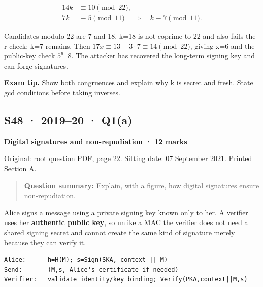 \documentclass[11pt,a4paper]{article}
\begin{document}
\[
\begin{aligned}14k&\equiv10\pmod{22},\\7k&\equiv5\pmod{11}\quad\Longrightarrow\quad k\equiv7\pmod{11}.\end{aligned}
\]

Candidates modulo 22 are 7 and 18. k=\allowbreak{}18 is not coprime to 22 and also fails the r check; k=\allowbreak{}7 remains. Then \(17x\equiv13-3\cdot7\equiv14\pmod{22}\),\allowbreak{} giving x=\allowbreak{}6 and the public-key check \(5^{6}\)≡8. The attacker has recovered the long-term signing key and can forge signatures.



{\color{ForestGreen}\textbf{Exam tip.} Show both congruences and explain why k is secret and fresh. State gcd conditions before taking inverses.}




\clearpage
\subsection{S48 · 2019–20 · Q1(a)}\label{s48}

\textbf{Digital signatures and non-repudiation · 12 marks}


Original: \href{../../CSE405-Security_Merged.pdf\#page=22}{root question PDF,\allowbreak{} page 22}. Sitting date: 07 September 2021. Printed Section A.



\begin{quote}\small

\textbf{Question summary:} Explain,\allowbreak{} with a figure,\allowbreak{} how digital signatures ensure non-repudiation.



\end{quote}

Alice signs a message using a private signing key known only to her. A verifier uses her \textbf{authentic public key},\allowbreak{} so unlike a MAC the verifier does not need a shared signing secret and cannot create the same kind of signature merely because they can verify it.



\begin{Verbatim}[breaklines=true,breakanywhere=true,fontsize=\small,frame=single,rulecolor=\color{PanelBorder}]
Alice:      h=H(M); s=Sign(SKA, context || M)
Send:       (M,s, Alice's certificate if needed)
Verifier:   validate identity/key binding; Verify(PKA,context||M,s)
\end{Verbatim}
\end{document}
